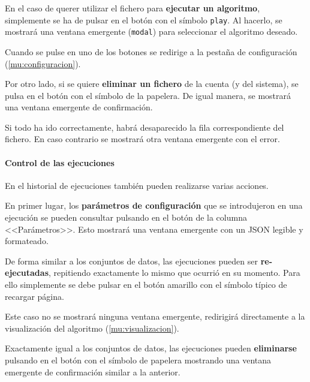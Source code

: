 En el caso de querer utilizar el fichero para \textbf{ejecutar un algoritmo},
simplemente se ha de pulsar en el botón con el símbolo \texttt{play}. Al
hacerlo, se mostrará una ventana emergente (\texttt{modal}) para seleccionar el
algoritmo deseado.


Cuando se pulse en uno de los botones se redirige a la pestaña de configuración
(\ref{mu:configuracion}).

\label{mu:eliminardataset}
Por otro lado, si se quiere \textbf{eliminar un fichero} de la cuenta (y del
sistema), se pulsa en el botón con el símbolo de la papelera. De igual manera,
se mostrará una ventana emergente de confirmación.


Si todo ha ido correctamente, habrá desaparecido la fila correspondiente del
fichero. En caso contrario se mostrará otra ventana emergente con el error.

\paragraph{Control de las ejecuciones} En el historial de ejecuciones también
pueden realizarse varias acciones.

\label{mu:parametrosrun}
En primer lugar, los \textbf{parámetros de configuración} que se introdujeron en
una ejecución se pueden consultar pulsando en el botón de la columna
<<Parámetros>>. Esto mostrará una ventana emergente con un JSON legible y
formateado.


De forma similar a los conjuntos de datos, las ejecuciones pueden ser
\textbf{re-ejecutadas}, repitiendo exactamente lo mismo que ocurrió en su
momento. Para ello simplemente se debe pulsar en el botón amarillo con el
símbolo típico de recargar página.

Este caso no se mostrará ninguna ventana emergente, redirigirá directamente a la
visualización del algoritmo (\ref{mu:visualizacion}).

\label{mu:eliminarrun}
Exactamente igual a los conjuntos de datos, las ejecuciones pueden
\textbf{eliminarse} pulsando en el botón con el símbolo de papelera mostrando
una ventana emergente de confirmación similar a la anterior.

